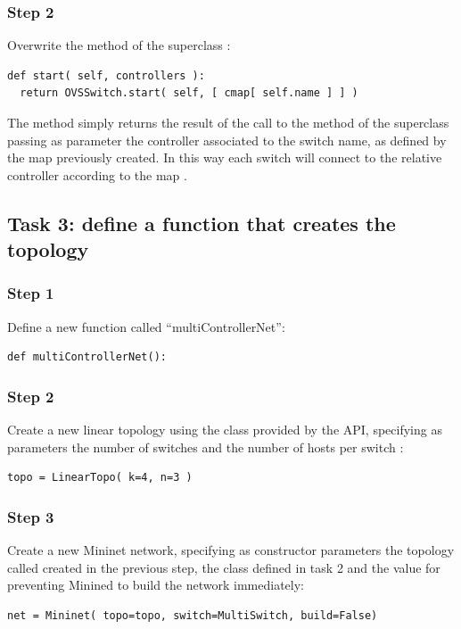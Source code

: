 \subsubsection*{Step 2}
Overwrite the method  of the superclass :
\begin{lstlisting}
def start( self, controllers ):
  return OVSSwitch.start( self, [ cmap[ self.name ] ] )
\end{lstlisting}
The method simply returns the result of the call to the method  of the
superclass passing as parameter the controller associated to the switch name, as defined by
the map  previously created. In this way each switch will connect to
the relative controller according to the map .






\subsection*{Task 3: define a function that creates the topology}
\subsubsection*{Step 1}
Define a new function called ``multiControllerNet'':
\begin{lstlisting}
def multiControllerNet():
\end{lstlisting}

\subsubsection*{Step 2}
Create a new linear topology using the class  provided by
the API, specifying as parameters the number of switches  and the
number of hosts per switch :
\begin{lstlisting}
topo = LinearTopo( k=4, n=3 )
\end{lstlisting}

\subsubsection*{Step 3}
Create a new Mininet network, specifying as constructor parameters the topology
called  created in the previous step, the class 
defined in task 2 and the value  for preventing Minined to build
the network immediately:
\begin{lstlisting}
net = Mininet( topo=topo, switch=MultiSwitch, build=False)
\end{lstlisting}

